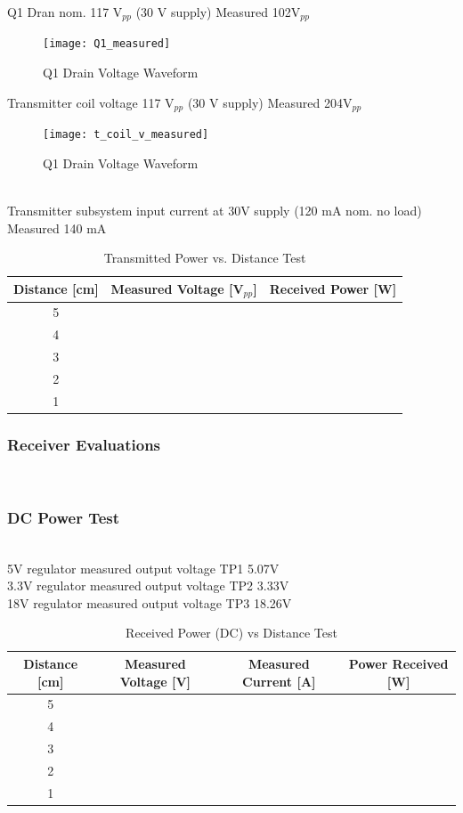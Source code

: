 \documentclass[12pt]{article}
\begin{document}
\noindent
Q1 Dran nom. 117 V$_{pp}$ (30 V supply) Measured 102V$_{pp}$
\hfill
\begin{figure}[h!]
\centering
\texttt{[image: Q1\_measured]}
\caption{Q1 Drain Voltage Waveform}
\end{figure}

\noindent
Transmitter coil voltage 117 V$_{pp}$ (30 V supply) Measured 204V$_{pp}$
\hfill
\begin{figure}[h!]
\centering
\texttt{[image: t\_coil\_v\_measured]}
\caption{Q1 Drain Voltage Waveform}
\end{figure}
\hfill 
\pagebreak
\hfill \\
\noindent
Transmitter subsystem input current at 30V supply (120 mA nom. no load) Measured 140 mA

\begin{table}[h!]
\centering
\caption{Transmitted Power vs. Distance Test}
\begin{tabular}{ | c | c | c | }
\hline
 Distance [cm] & Measured Voltage [V$_{pp}$] & Received Power [W] \\
 \hline
5 & & \\
\hline
4 & & \\
\hline
3 & & \\
\hline
2 & & \\
\hline
1 & & \\
\hline
\end{tabular}
\end{table}

\subsubsection{Receiver Evaluations} \hfill \\
\subsubsection*{DC Power Test} \hfill \\
\noindent
5V regulator measured output voltage TP1 5.07V\\
3.3V regulator measured output voltage TP2 3.33V\\
18V regulator measured output voltage TP3 18.26V\\

\begin{table}[h!]
\centering
\caption{Received Power (DC) vs Distance Test}
\begin{tabular}{ | c | c | c |  c |}
\hline
Distance [cm] & Measured Voltage [V] & Measured Current [A] & Power Received [W] \\
\hline
5 & & & \\
\hline
4 & & & \\
\hline
3 & & & \\
\hline
2 & & & \\
\hline
1 & & & \\
\hline
\end{tabular}
\end{table}
\end{document}
